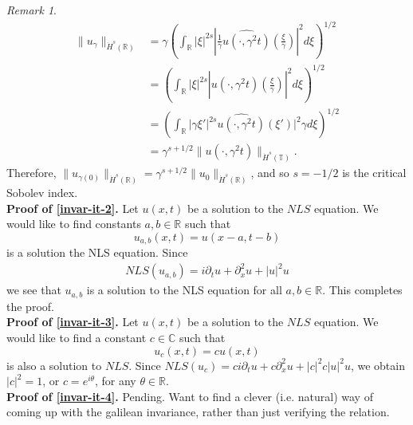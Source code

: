 \documentclass[12pt,reqno]{amsart}
\numberwithin{equation}{section}  %
\numberwithin{figure}{section}
\newcommand{\rr}{\mathbb{R}}
\newcommand{\cc}{\mathbb{C}}
\newcommand{\ci}{\mathbb{T}}
\newcommand{\wh}{\widehat}
\newcommand{\p}{\partial}
\theoremstyle{plain}
\theoremstyle{definition}
\theoremstyle{remark}
\newtheorem{remark}{Remark}
\begin{document}
\begin{framed}
\begin{remark}
\begin{equation*}
\begin{split}
  \| u_{\gamma} \|_{\dot{H}^s(\rr)} 
  & = \gamma\left( \int_{\rr} | \xi |^{2s} |
  \frac{1}{\gamma}\wh{u(\cdot, \gamma^{2}t)}(\frac{\xi}{\gamma}) |^2 d \xi
  \right)^{1/2}
  \\
  & = \left( \int_{\rr}| \xi |^{2s} | \wh{u(\cdot,
  \gamma^{2}t)}(\frac{\xi}{\gamma}) |^2 d \xi  \right)^{1/2}
  \\
  & = \left( \int_{\rr} | \gamma \xi' |^{2s} 
  \wh{u(\cdot, \gamma^{2}t)}(\xi') |^2 \gamma d \xi
  \right)^{1/2}
  \\
  & = \gamma^{s + 1/2} \|u(\cdot, \gamma^{2}t) \|_{\dot{H}^s (\ci)}.
\end{split}
\end{equation*}
%
%
Therefore, $\| u_{\gamma(0)} \|_{\dot{H}^s(\rr)} = \gamma^{s + 1/2} \|
u_{0} \|_{\dot{H}^{s}(\rr)}$, and so $s=-1/2$ is the critical Sobolev index.
\label{rem:invariances}
\\
{\bf Proof of \eqref{invar-it-2}.} Let $u(x, t)$ be a solution to the $NLS$ equation.
We would like to find constants
$a, b \in \rr$ such that $$u_{a,b}(x,t) = u(x -a, t - b)$$ is a solution the NLS
equation. Since
%
%
\begin{equation*}
\begin{split}
  NLS(u_{a,b}) = i \p_t u + \p_x^{2} u  + | u |^{2} u 
\end{split}
\end{equation*}
%
%
we see that $u_{a,b}$ is a solution to the NLS equation for all $a, b \in \rr$.
This completes the proof.
\\
{\bf Proof of \eqref{invar-it-3}.}
Let $u(x, t)$ be a solution to the $NLS$ equation.
We would like to find a constant
$c \in \cc$ such that
\[
u_c (x, t) = c u(x, t)
\]
is also a solution to $NLS$.  Since 
$NLS(u_{c}) = c i \p_{t} u  + c \p_{x}^{2} u + |c|^2c | u |^{2}u$, we obtain
$|c|^{2} = 1$, or $c = e^{i \theta}$, for any $\theta \in \rr$.
\\
{\bf Proof of \eqref{invar-it-4}.} Pending. Want to find a clever (i.e. natural)
way of coming up with the galilean invariance, rather than just verifying the relation.
\end{remark}
\end{framed}
%
%

%
%
%
%
%
%
%
%
\end{document}
